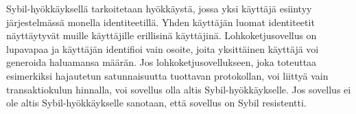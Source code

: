 Sybil-hyökkäyksellä \cite{douceur2002sybil} tarkoitetaan hyökkäystä, jossa yksi käyttäjä esiintyy järjestelmässä monella identiteetillä. Yhden käyttäjän luomat identiteetit näyttäytyvät muille käyttäjille erillisinä käyttäjinä. Lohkoketjusovellus on lupavapaa ja käyttäjän identifioi vain osoite, joita yksittäinen käyttäjä voi generoida haluamansa määrän. Jos lohkoketjusovellukseen, joka toteuttaa esimerkiksi hajautetun satunnaisuutta tuottavan protokollan, voi liittyä vain transaktiokulun hinnalla, voi sovellus olla altis Sybil-hyökkäykselle. Jos sovellus ei ole altis Sybil-hyökkäykselle sanotaan, että sovellus on Sybil resistentti.